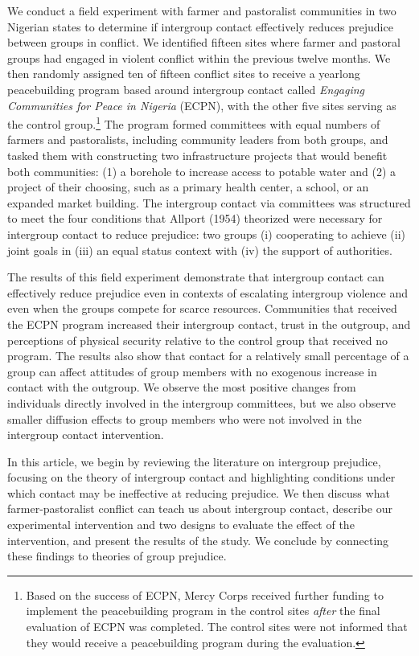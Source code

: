 \documentclass[11pt]{article}
\begin{document}
We conduct a field experiment with farmer and pastoralist communities in
two Nigerian states to determine if intergroup contact effectively
reduces prejudice between groups in conflict. We identified fifteen
sites where farmer and pastoral groups had engaged in violent conflict
within the previous twelve months. We then randomly assigned ten of
fifteen conflict sites to receive a yearlong peacebuilding program based
around intergroup contact called \emph{Engaging Communities for Peace in
Nigeria} (ECPN), with the other five sites serving as the control
group.\footnote{Based on the success of ECPN, Mercy Corps received
  further funding to implement the peacebuilding program in the control
  sites \emph{after} the final evaluation of ECPN was completed. The
  control sites were not informed that they would receive a
  peacebuilding program during the evaluation.} The program formed
committees with equal numbers of farmers and pastoralists, including
community leaders from both groups, and tasked them with constructing
two infrastructure projects that would benefit both communities: (1) a
borehole to increase access to potable water and (2) a project of their
choosing, such as a primary health center, a school, or an expanded
market building. The intergroup contact via committees was structured to
meet the four conditions that Allport (1954) theorized were necessary
for intergroup contact to reduce prejudice: two groups (i) cooperating
to achieve (ii) joint goals in (iii) an equal status context with (iv)
the support of authorities.

The results of this field experiment demonstrate that intergroup contact
can effectively reduce prejudice even in contexts of escalating
intergroup violence and even when the groups compete for scarce
resources. Communities that received the ECPN program increased their
intergroup contact, trust in the outgroup, and perceptions of physical
security relative to the control group that received no program. The
results also show that contact for a relatively small percentage of a
group can affect attitudes of group members with no exogenous increase
in contact with the outgroup. We observe the most positive changes from
individuals directly involved in the intergroup committees, but we also
observe smaller diffusion effects to group members who were not involved
in the intergroup contact intervention.

In this article, we begin by reviewing the literature on intergroup
prejudice, focusing on the theory of intergroup contact and highlighting
conditions under which contact may be ineffective at reducing prejudice.
We then discuss what farmer-pastoralist conflict can teach us about
intergroup contact, describe our experimental intervention and two
designs to evaluate the effect of the intervention, and present the
results of the study. We conclude by connecting these findings to
theories of group prejudice.
\end{document}
